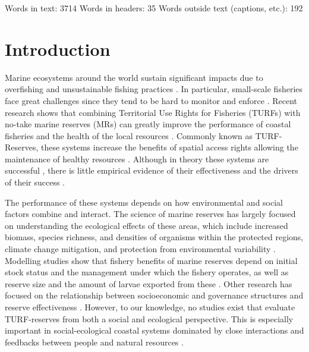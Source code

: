 \documentclass{frontiersSCNS}
\begin{document}
Words in text: 3714 \textbar{} Words in headers: 35 \textbar{} Words
outside text (captions, etc.): 192

\clearpage

\hypertarget{introduction}{%
\section{Introduction}\label{introduction}}

Marine ecosystems around the world sustain significant impacts due to
overfishing and unsustainable fishing practices
\citep{halpern_2008-dK,worm_2006-IB,pauly_2005-qV}. In particular,
small-scale fisheries face great challenges since they tend to be hard
to monitor and enforce \citep{costello_2012}. Recent research shows that
combining Territorial Use Rights for Fisheries (TURFs) with no-take
marine reserves (MRs) can greatly improve the performance of coastal
fisheries and the health of the local resources
\citep{costello_2010-Ix,lester_2017}. Commonly known as TURF-Reserves,
these systems increase the benefits of spatial access rights allowing
the maintenance of healthy resources
\citep{afflerbach_2014-HP,lester_2017}. Although in theory these systems
are successful \citep{costello_2010-Ix,smallhornwest_2018}, there is
little empirical evidence of their effectiveness and the drivers of
their success \citep{afflerbach_2014-HP,lester_2017}.

The performance of these systems depends on how environmental and social
factors combine and interact. The science of marine reserves has largely
focused on understanding the ecological effects of these areas, which
include increased biomass, species richness, and densities of organisms
within the protected regions, climate change mitigation, and protection
from environmental variability
\citep{lester_2009-Ks,giakoumi_2017-V2,sala_2017-69,roberts_2017-J9,micheli_2012-EU}.
Modelling studies show that fishery benefits of marine reserves depend
on initial stock status and the management under which the fishery
operates, as well as reserve size and the amount of larvae exported from
these \citep{hilborn_2006,krueck_2017-J1,deleo_2015}. Other research has
focused on the relationship between socioeconomic and governance
structures and reserve effectiveness
\citep{halpern_2013,lpezangarita_2014,mascia_2017-m_}. However, to our
knowledge, no studies exist that evaluate TURF-reserves from both a
social and ecological perspective. This is especially important in
social-ecological coastal systems dominated by close interactions and
feedbacks between people and natural resources \citep{ostrom_2009-hg}.
\end{document}
